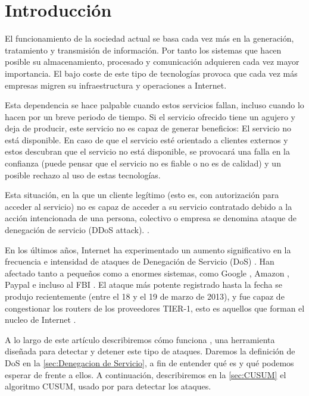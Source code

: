 \section{Introducción}\label{introduccion} %
El funcionamiento de la sociedad actual se basa cada vez más en la generación, tratamiento y transmisión de información.
Por tanto los sistemas que hacen posible su almacenamiento, procesado y comunicación adquieren cada vez mayor importancia.
El bajo coste de este tipo de tecnologías provoca que cada vez más empresas migren su infraestructura y operaciones a Internet.

Esta dependencia se hace palpable cuando estos servicios fallan, incluso cuando lo hacen por un breve periodo de tiempo. 
Si el servicio ofrecido tiene un agujero y deja de producir, este servicio no es capaz de generar beneficios: El servicio no
está disponible. En caso de que el servicio esté orientado a clientes externos y estos descubran que el servicio no está
disponible, se provocará una falla en la confianza (puede pensar que el servicio no es fiable o no es de calidad) y un posible
rechazo al uso de estas tecnologías. 

Esta situación, en la que un cliente legítimo (esto es, con autorización para acceder al servicio) no es capaz de 
acceder a su servicio contratado debido a la acción intencionada de una persona, colectivo o empresa se denomina ataque 
de denegación de servicio (DDoS attack). \cite{Raghavan}. %

En los últimos años, Internet ha experimentado un aumento significativo en la frecuencia e intensidad de ataques de 
Denegación de Servicio (DoS) \cite{kakaspersky_2H2011_DDoS_analisis}. Han afectado tanto a pequeños como a enormes 
sistemas, como Google \cite{Google+_DDoS_attack}, Amazon \cite{Amazon_DDoS_attack}, Paypal e incluso al FBI 
\cite{FBI_DDoS_attack}. El ataque más potente registrado hasta la fecha se produjo recientemente (entre el 18 y el 19 de 
marzo de 2013), y fue capaz de congestionar los routers de los proveedores TIER-1, esto es aquellos que
forman el nucleo de Internet \cite{spamhaus_DDoS_attack}. 

A lo largo de este artículo describiremos cómo funciona \redborderddos, una herramienta diseñada 
para detectar y detener este tipo de ataques. Daremos la
definición de \gls{DoS} en la \autoref{sec:Denegacion de Servicio},
a fin de entender qué es y qué podemos esperar de \redborderddos{}
frente a ellos. A continuación, describiremos en la 
\autoref{sec:CUSUM} el algoritmo
CUSUM, usado por \redborderddos{} para detectar los ataques.

